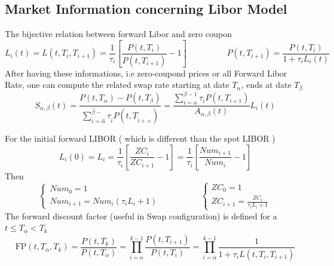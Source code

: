 \documentclass[a4paper,10pt]{article}
\newcommand{\Ti}{T_{i}}
\newcommand{\Ta}{T_{\alpha}}
\newcommand{\Tii}{T_{i+1}}
\newcommand{\Pti}{P(t,T_{i})}
\newcommand{\Ptii}{P(t,T_{i+1})}
\newcommand{\Lti}{L(t,\Ti,\Tii)}
\newcommand{\Lit}{L_{i}(t)}
\newcommand{\ZCi}{ZC_{i}}
\newcommand{\ZCii}{ZC_{i+1}}
\newcommand{\Numi}{Num_{i}}
\newcommand{\Numii}{Num_{i+1}}
\begin{document}
\subsection{Market Information concerning Libor Model}
The bijective relation between forward Libor and zero coupon
\begin{equation}
\label{eq:libor_zc}
L_i(t) = L(t,\Ti,\Tii) = \frac{1}{\tau_i} \left[ \frac{\Pti}{\Ptii} - 1  \right]
\hspace{2cm}
{\Ptii} = \frac{\Pti}{1+ \tau_i L_i(t)}
\end{equation}
After having these informations, i.e zero-coupond prices or all Forward Libor Rate, one can compute the related swap rate starting at date $T_{\alpha}$, ends at date $T_{\beta}$
\begin{equation}
\label{eq:swap_rate}
S_{\alpha,\beta}(t) 
= 
\frac{P(t,T_{\alpha})-P(t,T_{\beta})}{\sum^{\hat{\beta}-}_{\hat{i}=\hat{\alpha}}\tau_{\hat{i}}P(t,T_{\hat{i}++})} 
=
\frac{\sum^{\beta-1}_{i=\alpha} \tau_i \Ptii }{A_{\alpha,\beta}(t)} \Lit 
\end{equation}


For the initial forward LIBOR ( which is different than the spot LIBOR )
\[
L_i(0) = L_i = \frac{1}{\tau_i} \left[ \frac{\ZCi}{\ZCii} - 1  \right] = \frac{1}{\tau_i} \left[ \frac{\Numii}{\Numi} - 1  \right]
\]
Then
\[
\left\{
\begin{array}{l}
Num_0 = 1 \\
\Numii = \Numi(\tau_i L_i +1)
\end{array}
\right.
\hspace{2cm}
\left\{
\begin{array}{l}
ZC_0 = 1 \\
\ZCii = \frac{\ZCi}{\tau_i L_i +1}
\end{array}
\right.
\]
The forward discount factor (useful in Swap configuration) is defined for a $t\leq \Ta < T_k$
\[
\text{FP}(t,\Ta,T_k)= \frac{P(t,T_k)}{P(t,\Ta)}
 = \prod^{k-1}_{i=\alpha} \frac{\Ptii}{\Pti} 
 = \prod^{k-1}_{i=\alpha} \frac{1}{1+\tau_i \Lti }
\]
\end{document}
